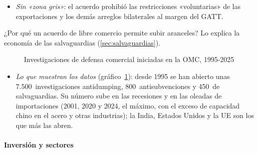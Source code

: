 \documentclass[11pt]{article}
\begin{document}
\begin{itemize}
\begin{itemize}
  \item \emph{Sin «zona gris»}: el acuerdo prohibió las restricciones «voluntarias» de las exportaciones y los demás arreglos bilaterales al margen del GATT.
  \end{itemize}
  ¿Por qué un acuerdo de libre comercio permite subir aranceles? Lo explica la economía de las salvaguardias (\ref{sec:salvaguardias}).
\end{itemize}

\begin{figure}[H]
\centering
\caption{Investigaciones de defensa comercial iniciadas en la OMC, 1995-2025}\label{fig:defensa}
\end{figure}

\begin{itemize}
\item \emph{Lo que muestran los datos} (gráfico~\ref{fig:defensa}): desde 1995 se han abierto unas 7.500~investigaciones antidumping, 800~antisubvenciones y 450~de salvaguardias. Su número sube en las recesiones y en las oleadas de importaciones (2001, 2020 y 2024, el máximo, con el exceso de capacidad chino en el acero y otras industrias); la India, Estados Unidos y la UE son los que más las abren.
\end{itemize}

\paragraph{Inversión y sectores}
\end{document}
